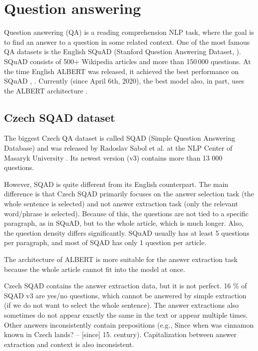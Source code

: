 \documentclass[
  printed, %
  color,   %
  table,   %
  oneside, %
  lof,     %
  lot,     %
]{fithesis3}
\begin{document}
\clearpage

\section{Question answering}
Question answering (QA) is a reading comprehension NLP task, where the goal is to find an answer to a question in some related context. One of the most famous QA datasets is the English SQuAD (Stanford Question Answering Dataset, \parencite{squad}). SQuAD consists of 500+ Wikipedia articles and more than 150\,000 questions. At the time English ALBERT was released, it achieved the best performance on SQuAD \parencite[Table 10]{albert}, \parencite{squad}. Currently (since April 6th, 2020), the best model also, in part, uses the ALBERT architecture \parencite{squad}.


\subsection{Czech SQAD dataset}
The biggest Czech QA dataset is called SQAD (Simple Question Answering Database) and was released by Radoslav Sabol et al. at the NLP Center of Masaryk University \parencite{sqad}. Its newest version (v3) contains more than 13 000 questions.

However, SQAD is quite different from its English counterpart. The main difference is that Czech SQAD primarily focuses on the answer selection task (the whole sentence is selected) and not answer extraction task (only the relevant word/phrase is selected). Because of this, the questions are not tied to a specific paragraph, as in SQuAD, but to the whole article, which is much longer. Also, the question density differs significantly. SQuAD usually has at least 5 questions per paragraph, and most of SQAD has only 1 question per article.

The architecture of ALBERT is more suitable for the answer extraction task because the whole article cannot fit into the model at once.

Czech SQAD contains the answer extraction data, but it is not perfect. 16 \% of SQAD v3 are yes/no questions, which cannot be answered by simple extraction (if we do not want to select the whole sentence). The answer extractions also sometimes do not appear exactly the same in the text or appear multiple times. Other answers inconsistently contain prepositions (e.g., Since when was cinnamon known in Czech lands? -- [since] 15. century). Capitalization between answer extraction and context is also inconsistent.
\end{document}
